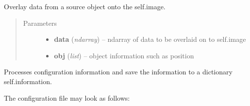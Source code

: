 \documentclass[a4paper,12pt,english]{sphinxmanual}
\begin{document}
\begin{fulllineitems}
\begin{fulllineitems}
\begin{quote}
\begin{description}
\end{description}\end{quote}

\end{fulllineitems}


\begin{fulllineitems}
\label{simulator:simulator.simulator.VISsimulator.overlayToCCD}
Overlay data from a source object onto the self.image.
\begin{quote}\begin{description}
\item[{Parameters}] \leavevmode\begin{itemize}
\item {} 
\textbf{data} (\emph{ndarray}) -- ndarray of data to be overlaid on to self.image

\item {} 
\textbf{obj} (\emph{list}) -- object information such as position

\end{itemize}

\end{description}\end{quote}

\end{fulllineitems}


\begin{fulllineitems}
\label{simulator:simulator.simulator.VISsimulator.processConfigs}
Processes configuration information and save the information to a dictionary self.information.

The configuration file may look as follows:


\end{fulllineitems}
\end{fulllineitems}
\end{document}
